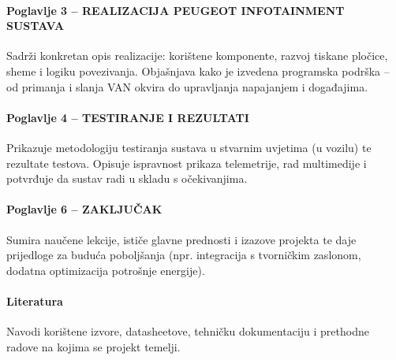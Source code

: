 \paragraph{Poglavlje 3 – REALIZACIJA PEUGEOT INFOTAINMENT SUSTAVA}
Sadrži konkretan opis realizacije: korištene komponente, razvoj tiskane pločice, sheme i logiku povezivanja. Objašnjava kako je izvedena programska podrška – od primanja i slanja VAN okvira do upravljanja napajanjem i događajima.

\paragraph{Poglavlje 4 – TESTIRANJE I REZULTATI}
Prikazuje metodologiju testiranja sustava u stvarnim uvjetima (u vozilu) te rezultate testova. Opisuje ispravnost prikaza telemetrije, rad multimedije i potvrđuje da sustav radi u skladu s očekivanjima.

\paragraph{Poglavlje 6 – ZAKLJUČAK}
Sumira naučene lekcije, ističe glavne prednosti i izazove projekta te daje prijedloge za buduća poboljšanja (npr. integracija s tvorničkim zaslonom, dodatna optimizacija potrošnje energije).

\paragraph{Literatura}
Navodi korištene izvore, datasheetove, tehničku dokumentaciju i prethodne radove na kojima se projekt temelji.